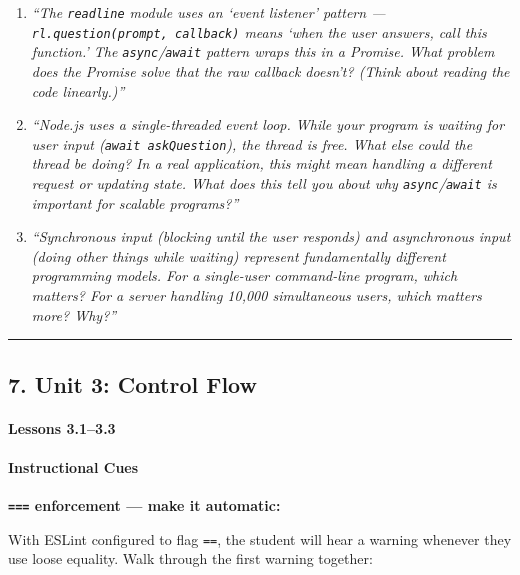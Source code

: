 \documentclass[
  justified,
  openright,
]{tufte-book}
\let\subsubsection\paragraph
\let\paragraph\paragraph
\let\subsubsection\paragraph
\let\paragraph\paragraph
\begin{document}
\begin{enumerate}
\def\labelenumi{\arabic{enumi}.}
\item
  \emph{``The \texttt{readline} module uses an `event listener' pattern
  --- \texttt{rl.question(prompt,\ callback)} means `when the user
  answers, call this function.' The \texttt{async}/\texttt{await}
  pattern wraps this in a Promise. What problem does the Promise solve
  that the raw callback doesn't? (Think about reading the code
  linearly.)''}
\item
  \emph{``Node.js uses a single-threaded event loop. While your program
  is waiting for user input (\texttt{await\ askQuestion}), the thread is
  free. What else could the thread be doing? In a real application, this
  might mean handling a different request or updating state. What does
  this tell you about why \texttt{async}/\texttt{await} is important for
  scalable programs?''}
\item
  \emph{``Synchronous input (blocking until the user responds) and
  asynchronous input (doing other things while waiting) represent
  fundamentally different programming models. For a single-user
  command-line program, which matters? For a server handling 10,000
  simultaneous users, which matters more? Why?''}
\end{enumerate}

\begin{center}\rule{0.5\linewidth}{0.5pt}\end{center}

\subsection{7. Unit 3: Control Flow}\label{unit-3-control-flow}

\subsubsection{Lessons 3.1--3.3}\label{lessons-3.13.3}

\paragraph{Instructional Cues}\label{instructional-cues-3}

\textbf{\texttt{===} enforcement --- make it automatic:}

With ESLint configured to flag \texttt{==}, the student will hear a
warning whenever they use loose equality. Walk through the first warning
together:
\end{document}
